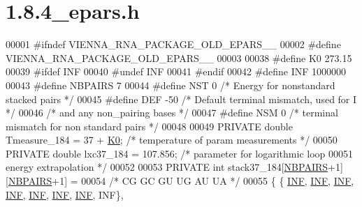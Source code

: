 \hypertarget{1_88_84__epars_8h_source}{}\section{1.8.4\+\_\+epars.h}
\label{1_88_84__epars_8h_source}

\begin{DoxyCode}
00001 \textcolor{preprocessor}{#ifndef VIENNA\_RNA\_PACKAGE\_OLD\_EPARS\_\_}
00002 \textcolor{preprocessor}{#define VIENNA\_RNA\_PACKAGE\_OLD\_EPARS\_\_}
00003 
00038 \textcolor{preprocessor}{#define K0        273.15}
00039 \textcolor{preprocessor}{#ifdef INF}
00040 \textcolor{preprocessor}{#undef INF}
00041 \textcolor{preprocessor}{#endif}
00042 \textcolor{preprocessor}{#define INF       1000000}
00043 \textcolor{preprocessor}{#define NBPAIRS   7}
00044 \textcolor{preprocessor}{#define NST       0     }\textcolor{comment}{/* Energy for nonstandard stacked pairs */}\textcolor{preprocessor}{}
00045 \textcolor{preprocessor}{#define DEF       -50   }\textcolor{comment}{/* Default terminal mismatch, used for I */}\textcolor{preprocessor}{}
00046                         \textcolor{comment}{/* and any non\_pairing bases */}
00047 \textcolor{preprocessor}{#define NSM       0     }\textcolor{comment}{/* terminal mismatch for non standard pairs */}\textcolor{preprocessor}{}
00048 
00049 PRIVATE \textcolor{keywordtype}{double} Tmeasure\_184 = 37 + \hyperlink{energy__const_8h_a307c72605e3713972b4f4fb2d53ea20e}{K0};  \textcolor{comment}{/* temperature of param measurements */}
00050 PRIVATE \textcolor{keywordtype}{double} lxc37\_184    = 107.856;  \textcolor{comment}{/* parameter for logarithmic loop}
00051 \textcolor{comment}{                                           energy extrapolation */}
00052 
00053 PRIVATE \textcolor{keywordtype}{int} stack37\_184[\hyperlink{energy__const_8h_a5e75221c779d618eab81e096f37e32ce}{NBPAIRS}+1][\hyperlink{energy__const_8h_a5e75221c779d618eab81e096f37e32ce}{NBPAIRS}+1] =
00054 \textcolor{comment}{/*          CG     GC     GU     UG     AU     UA  */}
00055 \{ \{  \hyperlink{energy__const_8h_a12c2040f25d8e3a7b9e1c2024c618cb6}{INF},   \hyperlink{energy__const_8h_a12c2040f25d8e3a7b9e1c2024c618cb6}{INF},   \hyperlink{energy__const_8h_a12c2040f25d8e3a7b9e1c2024c618cb6}{INF},   \hyperlink{energy__const_8h_a12c2040f25d8e3a7b9e1c2024c618cb6}{INF},   \hyperlink{energy__const_8h_a12c2040f25d8e3a7b9e1c2024c618cb6}{INF},   \hyperlink{energy__const_8h_a12c2040f25d8e3a7b9e1c2024c618cb6}{INF},   \hyperlink{energy__const_8h_a12c2040f25d8e3a7b9e1c2024c618cb6}{INF}, INF\},

\end{DoxyCode}
